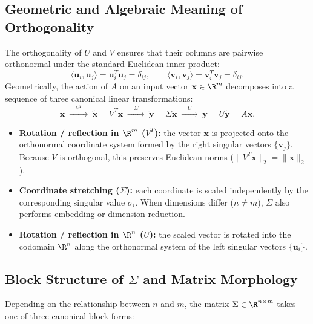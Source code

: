 \subsection{Geometric and Algebraic Meaning of Orthogonality}

The orthogonality of $U$ and $V$ ensures that their columns are pairwise orthonormal under the standard Euclidean inner product:
\begin{equation}
    \langle \mathbf{u}_i, \mathbf{u}_j \rangle = \mathbf{u}_i^T \mathbf{u}_j = \delta_{ij}, \qquad \langle \mathbf{v}_i, \mathbf{v}_j \rangle = \mathbf{v}_i^T \mathbf{v}_j = \delta_{ij}.
\end{equation}
Geometrically, the action of $A$ on an input vector $\mathbf{x} \in \R^m$ decomposes into a sequence of three canonical linear transformations:
\begin{equation}
    \mathbf{x} \;\xrightarrow{\quad V^T \quad}\; \tilde{\mathbf{x}} = V^T \mathbf{x} \;\xrightarrow{\quad \Sigma \quad}\; \tilde{\mathbf{y}} = \Sigma \tilde{\mathbf{x}} \;\xrightarrow{\quad U \quad}\; \mathbf{y} = U \tilde{\mathbf{y}} = A\mathbf{x}.
\end{equation}
\begin{itemize}
    \item \textbf{Rotation / reflection in $\R^m$ ($V^T$):} the vector $\mathbf{x}$ is projected onto the orthonormal coordinate system formed by the right singular vectors $\{\mathbf{v}_j\}$. Because $V$ is orthogonal, this preserves Euclidean norms ($\|V^T \mathbf{x}\|_2 = \|\mathbf{x}\|_2$).
    \item \textbf{Coordinate stretching ($\Sigma$):} each coordinate is scaled independently by the corresponding singular value $\sigma_i$. When dimensions differ ($n \neq m$), $\Sigma$ also performs embedding or dimension reduction.
    \item \textbf{Rotation / reflection in $\R^n$ ($U$):} the scaled vector is rotated into the codomain $\R^n$ along the orthonormal system of the left singular vectors $\{\mathbf{u}_i\}$.
\end{itemize}

\subsection{Block Structure of \texorpdfstring{$\Sigma$}{Sigma} and Matrix Morphology}

Depending on the relationship between $n$ and $m$, the matrix $\Sigma \in \R^{n \times m}$ takes one of three canonical block forms:

